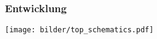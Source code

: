 \begin{frame}
	\frametitle{Entwicklung}
		\centering
		\texttt{[image: bilder/top\_schematics.pdf]}
	
\end{frame}